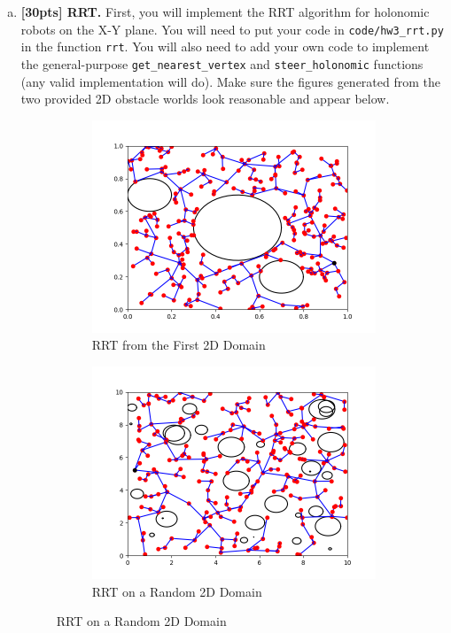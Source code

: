 \documentclass{article}
\begin{document}
\begin{enumerate}[(a)]
\item {\bf [30pts] RRT.} First, you will implement the RRT algorithm for holonomic robots on the X-Y plane. You will need to put your code in \texttt{code/hw3\_rrt.py} in the function \texttt{rrt}. You will also need to add your own code to implement the general-purpose \texttt{get\_nearest\_vertex} and \texttt{steer\_holonomic} functions (any valid implementation will do). Make sure the figures generated from the two provided 2D obstacle worlds look reasonable and appear below.

\begin{figure}[h!]
    \centering
    \begin{subfigure}{0.45\textwidth}
        \centering
        \includegraphics[width=\textwidth]{../figures/rrt_run1.png}
        \caption{RRT from the First 2D Domain}
    \end{subfigure}
    \hspace{0.2in}
    \begin{subfigure}{0.45\textwidth}
        \centering
        \includegraphics[width=\textwidth]{../figures/rrt_run2.png}
        \caption{RRT on a Random 2D Domain}
    \end{subfigure}
\end{figure}


\end{enumerate}
\end{document}
